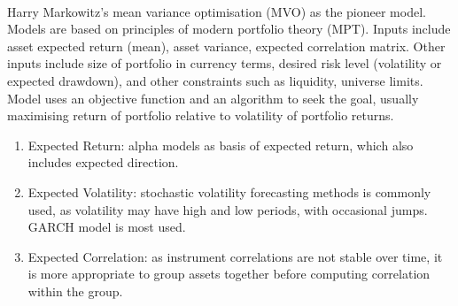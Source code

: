 \begin{remark} \\
Harry Markowitz's mean variance optimisation (MVO) as the pioneer model. Models are based on principles of modern portfolio theory (MPT). Inputs include asset expected return (mean), asset variance, expected correlation matrix. Other inputs include size of portfolio in currency terms, desired risk level (volatility or expected drawdown), and other constraints such as liquidity, universe limits.\\
Model uses an objective function and an algorithm to seek the goal, usually maximising return of portfolio relative to volatility of portfolio returns.
\begin{enumerate}[label=\roman*.]
\setlength{\itemsep}{0pt}
\item Expected Return: alpha models as basis of expected return, which also includes expected direction.
\item Expected Volatility: stochastic volatility forecasting methods is commonly used, as volatility may have high and low periods, with occasional jumps. GARCH model is most used.
\item Expected Correlation: as instrument correlations are not stable over time, it is more appropriate to group assets together before computing correlation within the group.
\end{enumerate}
\end{remark}

